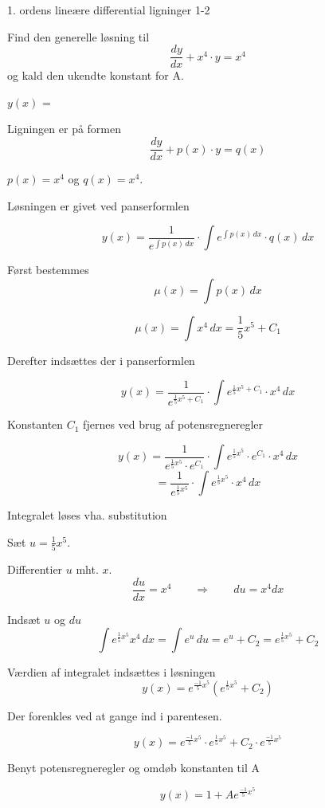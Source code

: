 \documentclass{article}
\begin{document}
\newpage

\begin{exercise}{1. ordens lineære differential ligninger 1-2}


Find den generelle løsning til
\[
\frac{dy}{dx} + x^4 \cdot y = x^4
\]
og kald den ukendte konstant for A.

$y(x)$ = 



\hint

Ligningen er på formen
\[
\frac{dy}{dx} + p(x) \cdot y = q(x)
\]

\hint

$p(x)=x^4$ og $q(x)=x^4$.

\hint

Løsningen er givet ved panserformlen


\hint

\[
y(x) = \frac{1}{e^{\int p(x) \, dx}} \cdot \int e^{\int p(x) \, dx} \cdot q(x) \, dx
\]

\hint

Først bestemmes
\[
\mu(x) = \int p(x) \, dx
\]

\hint
\[
\mu(x) = \int x^4 \, dx = \frac{1}{5} x^5 + C_1
\]

\hint
Derefter indsættes der i panserformlen

\hint

\[
y(x) = \frac{1}{e^{\frac{1}{5}x^5 + C_1}} \cdot \int e^{\frac{1}{5}x^5 + C_1} \cdot x^4 \, dx
\]


\hint

Konstanten $C_1$ fjernes ved brug af potensregneregler

\hint
\[
y(x) = \frac{1}{e^{\frac{1}{5}x^5} \cdot e^{C_1}} \cdot \int e^{\frac{1}{5}x^5} \cdot e^{C_1} \cdot x^4 \, dx
\]
\[
= \frac{1}{e^{\frac{1}{5}x^5}} \cdot \int e^{\frac{1}{5}x^5} \cdot x^4 \, dx
\]

\hint

Integralet løses vha. substitution


\hint
Sæt $u = \frac{1}{5}x^5$.

\hint

Differentier $u$ mht. $x$.
\[
\frac{du}{dx} = x^4 \qquad\Rightarrow \qquad du = x^4 dx
\]

\hint
Indsæt $u$ og $du$
\[
\int e^{\frac{1}{5}x^5}x^4 \, dx = \int e^{u} \, du = e^{u} + C_2 = e^{\frac{1}{5}x^5} + C_2
\]

\hint

Værdien af integralet indsættes i løsningen
\[
y(x) = e^{\frac{-1}{5}x^5} \left( e^{\frac{1}{5}x^5}+ C_2\right)
\]

\hint

Der forenkles ved at gange ind i parentesen.

\hint
\[
y(x) = e^{\frac{-1}{5}x^5} \cdot e^{\frac{1}{5}x^5} + C_2 \cdot e^{\frac{-1}{5}x^5}
\]

\hint

Benyt potensregneregler og omdøb konstanten til A

\hint
\[
y(x) = 1 + A e^{\frac{-1}{5}x^5}
\]


\end{exercise}
\end{document}
